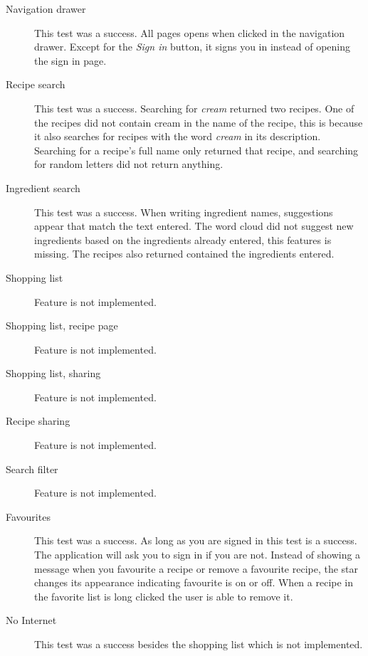 \begin{description}
\item[Navigation drawer] This test was a success. All pages opens when clicked in the navigation drawer. Except for the \textit{Sign in} button, it signs you in instead of opening the sign in page.
\item[Recipe search] This test was a success. Searching for \textit{cream} returned two recipes. One of the recipes did not contain cream in the name of the recipe, this is because it also searches for recipes with the word \textit{cream} in its description. Searching for a recipe's full name only returned that recipe, and searching for random letters did not return anything.
\item[Ingredient search] This test was a success. When writing ingredient names, suggestions appear that match the text entered. The word cloud did not suggest new ingredients based on the ingredients already entered, this features is missing. The recipes also returned contained the ingredients entered.
\item[Shopping list] Feature is not implemented.
\item[Shopping list, recipe page] Feature is not implemented.
\item[Shopping list, sharing] Feature is not implemented.
\item[Recipe sharing] Feature is not implemented.
\item[Search filter] Feature is not implemented.
\item[Favourites] This test was a success. As long as you are signed in this test is a success. The application will ask you to sign in if you are not. Instead of showing a message when you favourite a recipe or remove a favourite recipe, the star changes its appearance indicating favourite is on or off. When a recipe in the favorite list is long clicked the user is able to remove it.
\item[No Internet] This test was a success besides the shopping list which is not implemented.
\end{description}